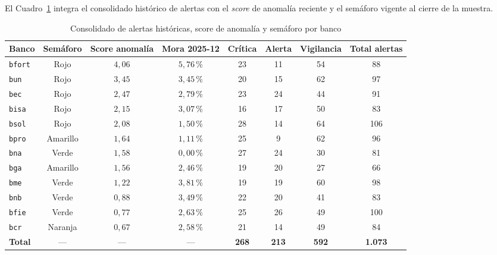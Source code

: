\documentclass[11pt,letterpaper]{article}
\begin{document}
El Cuadro~\ref{tab:alertas_bancos} integra el consolidado histórico de alertas con el \emph{score} de anomalía reciente y el semáforo vigente al cierre de la muestra.

\begin{table}[H]
\centering
\caption{Consolidado de alertas históricas, score de anomalía y semáforo por banco}
\label{tab:alertas_bancos}
\small
\begin{tabular}{lccccccc}
\toprule
Banco & Semáforo & Score anomalía & Mora 2025-12 & Crítica & Alerta & Vigilancia & Total alertas \\
\midrule
\texttt{bfort} & Rojo & \(4{,}06\) & \(5{,}76\,\%\) & 23 & 11 & 54 & 88 \\
\texttt{bun} & Rojo & \(3{,}45\) & \(3{,}45\,\%\) & 20 & 15 & 62 & 97 \\
\texttt{bec} & Rojo & \(2{,}47\) & \(2{,}79\,\%\) & 23 & 24 & 44 & 91 \\
\texttt{bisa} & Rojo & \(2{,}15\) & \(3{,}07\,\%\) & 16 & 17 & 50 & 83 \\
\texttt{bsol} & Rojo & \(2{,}08\) & \(1{,}50\,\%\) & 28 & 14 & 64 & 106 \\
\texttt{bpro} & Amarillo & \(1{,}64\) & \(1{,}11\,\%\) & 25 & 9 & 62 & 96 \\
\texttt{bna} & Verde & \(1{,}58\) & \(0{,}00\,\%\) & 27 & 24 & 30 & 81 \\
\texttt{bga} & Amarillo & \(1{,}56\) & \(2{,}46\,\%\) & 19 & 20 & 27 & 66 \\
\texttt{bme} & Verde & \(1{,}22\) & \(3{,}81\,\%\) & 19 & 19 & 60 & 98 \\
\texttt{bnb} & Verde & \(0{,}88\) & \(3{,}49\,\%\) & 22 & 20 & 41 & 83 \\
\texttt{bfie} & Verde & \(0{,}77\) & \(2{,}63\,\%\) & 25 & 26 & 49 & 100 \\
\texttt{bcr} & Naranja & \(0{,}67\) & \(2{,}58\,\%\) & 21 & 14 & 49 & 84 \\
\midrule
\textbf{Total} & --- & --- & --- & \textbf{268} & \textbf{213} & \textbf{592} & \textbf{1.073} \\
\bottomrule
\end{tabular}
\end{table}
\end{document}
